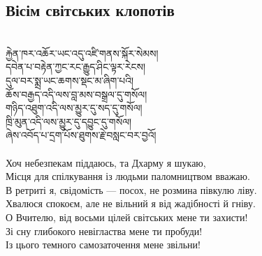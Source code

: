 \subsection*{Вісім світських клопотів}
\\
\ti
རྐྱེན་ཁར་འཆོར་ཡང་འདུ་འཛི་གནས་སྐོར་སེམས།\\
དབེན་པ་བརྟེན་ཀྱང་རང་རྒྱུད་ཤིང་ལྟར་རེངས། \\
དུལ་བར་སྨྲ་ཡང་ཆགས་སྡང་མ་ཞིག་པའི། \\
ཆོས་བརྒྱད་འདི་ལས་བླ་མས་བསྒྲལ་དུ་གསོལ། \\
གཉིད་འཐུག་འདི་ལས་མྱུར་དུ་སད་དུ་གསོལ། \\
ཁྲི་མུན་འདི་ལས་མྱུར་དུ་དབྱུང་དུ་གསོལ། \\
ཞེས་འབོད་པ་དྲག་པོས་ཐུགས་རྗེ་བསླང་བར་བྱའོ།\\
\\
\ru
Хоч небезпекам піддаюсь, та Дхарму я шукаю,\\
Місця для спілкування із людьми паломництвом вважаю.\\
В ретриті я, свідомість --- посох, не розмина півкулю ліву.\\
Хвалюся спокоєм, але не вільний я від жадібності й гніву.\\
О Вчителю, від восьми цілей світських мене ти захисти!\\
Зі сну глибокого невігластва мене ти пробуди!\\
Із цього темного самозаточення мене звільни!\\
